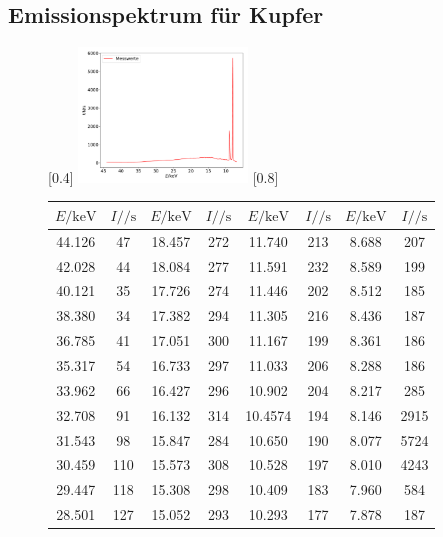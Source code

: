 \subsection{Emissionspektrum für Kupfer}
\begin{figure}
  \centering
  [0.4\textwidth]{
  \includegraphics[width=0.4\textwidth]{emission.pdf}
  }
  \hfill
  [0.8\textwidth]{
    \begin{tabular}{c c | c c | c c | c c}
      \toprule
      $E / \si{\kilo\electronvolt}$ & $I / \si{\per\second}$ & $E / \si{\kilo\electronvolt}$ & $I / \si{\per\second}$ &
      $E / \si{\kilo\electronvolt}$ & $I / \si{\per\second}$ & $E / \si{\kilo\electronvolt}$ & $I / \si{\per\second}$ \\
      \midrule
      44.126 & 47 & 18.457 & 272 & 11.740 & 213 & 8.688 & 207 \\
      42.028 & 44 & 18.084 & 277 & 11.591 & 232 & 8.589 & 199 \\
      40.121 & 35 & 17.726 & 274 & 11.446 & 202 & 8.512 & 185 \\
      38.380 & 34 & 17.382 & 294 & 11.305 & 216 & 8.436 & 187 \\
      36.785 & 41 & 17.051 & 300 & 11.167 & 199 & 8.361 & 186 \\
      35.317 & 54 & 16.733 & 297 & 11.033 & 206 & 8.288 & 186 \\
      33.962 & 66 & 16.427 & 296 & 10.902 & 204 & 8.217 & 285 \\
      32.708 & 91 & 16.132 & 314 & 10.4574 & 194 & 8.146 & 2915 \\
      31.543 & 98 & 15.847 & 284 & 10.650 & 190 & 8.077 & 5724 \\
      30.459 & 110 & 15.573 & 308 & 10.528 & 197 & 8.010 & 4243 \\
      29.447 & 118 & 15.308 & 298 & 10.409 & 183 & 7.960 & 584 \\
      28.501 & 127 & 15.052 & 293 & 10.293 & 177 & 7.878 & 187 \\

\end{tabular}}
\end{figure}
